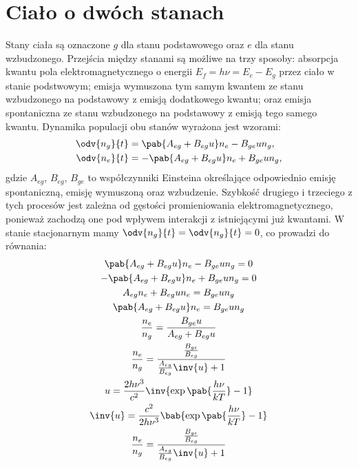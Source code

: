
\chapter{Ciało o dwóch stanach}
Stany ciała są oznaczone \(g\) dla stanu podstawowego oraz \(e\) dla stanu wzbudzonego. Przejścia między stanami są możliwe na trzy sposoby: absorpcja kwantu pola elektromagnetycznego o energii \(E_f = h\nu = E_e - E_g\) przez ciało w stanie podstwowym; emisja wymuszona tym samym kwantem ze stanu wzbudzonego na podstawowy z emisją dodatkowego kwantu; oraz emisja spontaniczna ze stanu wzbudzonego na podstawowy z emisją tego samego kwantu. Dynamika populacji obu stanów wyrażona jest wzorami:
\begin{align}
	\odv{n_g}{t} &=   \pab{A_{eg} + B_{eg} u}n_e - B_{ge} u n_g, \\
	\odv{n_e}{t} &= - \pab{A_{eg} + B_{eg} u}n_e + B_{ge} u n_g,
\end{align}
gdzie \(A_{eg}\), \(B_{eg}\), \(B_{ge}\) to współczynniki Einsteina określające odpowiednio emisję spontaniczną, emisję wymuszoną oraz wzbudzenie. Szybkość drugiego i trzeciego z tych procesów jest zależna od gęstości promieniowania elektromagnetycznego, ponieważ zachodzą one pod wpływem interakcji z istniejącymi już kwantami. W stanie stacjonarnym mamy \(\odv{n_g}{t} = \odv{n_g}{t} = 0\), co prowadzi do równania:
\begin{gather}
	  \pab{A_{eg} + B_{eg} u}n_e - B_{ge} u n_g = 0 \\
	- \pab{A_{eg} + B_{eg} u}n_e + B_{ge} u n_g = 0 \\
	A_{eg} n_e + B_{eg} u n_e = B_{ge} u n_g \\
	\pab{A_{eg} + B_{eg} u} n_e = B_{ge} u n_g \\
	\frac{n_e}{n_g} = \frac{B_{ge} u}{A_{eg} + B_{eg} u} \\
	\frac{n_e}{n_g} = \frac{\frac{B_{ge}}{B_{eg}}}{\frac{A_{eg}}{B_{eg}}\inv{u} + 1} \\
	u = \frac{2h\nu^3}{c^2}\inv{\exp\pab{\frac{h\nu}{kT}} - 1} \\
	\inv{u} = \frac{c^2}{2h\nu^3}\bab{\exp\pab{\frac{h\nu}{kT}} - 1} \\
	\frac{n_e}{n_g} = \frac{\frac{B_{ge}}{B_{eg}}}{\frac{A_{eg}}{B_{eg}}\inv{u} + 1} \\
\end{gather}

